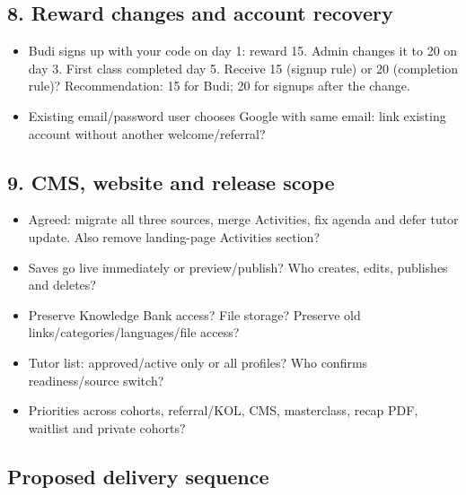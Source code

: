 \documentclass[11pt,a4paper]{article}
\begin{document}
\subsection*{8. Reward changes and account recovery}

\begin{itemize}
\item Budi signs up with your code on day 1: reward 15. Admin changes it to 20 on day 3. First class completed day 5. Receive 15 (signup rule) or 20 (completion rule)? Recommendation: 15 for Budi; 20 for signups after the change.
\item Existing email/\allowbreak{}password user chooses Google with same email: link existing account without another welcome/\allowbreak{}referral?
\end{itemize}

\subsection*{9. CMS, website and release scope}

\begin{itemize}
\item Agreed: migrate all three sources, merge Activities, fix agenda and defer tutor update. Also remove landing-page Activities section?
\item Saves go live immediately or preview/\allowbreak{}publish? Who creates, edits, publishes and deletes?
\item Preserve Knowledge Bank access? File storage? Preserve old links/\allowbreak{}categories/\allowbreak{}languages/\allowbreak{}file access?
\item Tutor list: approved/\allowbreak{}active only or all profiles? Who confirms readiness/\allowbreak{}source switch?
\item Priorities across cohorts, referral/\allowbreak{}KOL, CMS, masterclass, recap PDF, waitlist and private cohorts?
\end{itemize}

\subsection*{Proposed delivery sequence}
\end{document}
